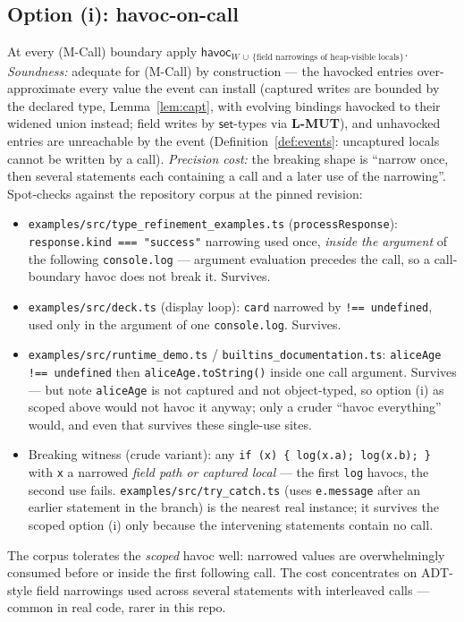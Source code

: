 \documentclass[11pt]{article}
\newcommand{\havoc}{\mathsf{havoc}}
\begin{document}
\subsection{Option (i): havoc-on-call}
At every (M-Call) boundary apply
$\havoc_{W \,\cup\, \{\text{field narrowings of heap-visible locals}\}}$.
\emph{Soundness:} adequate for (M-Call) by construction — the havocked
entries over-approximate every value the event can install (captured
writes are bounded by the declared type, Lemma~\ref{lem:capt}, with
evolving bindings havocked to their widened union instead; field writes
by $\mathsf{set}$-types via \textbf{L-MUT}), and unhavocked entries are
unreachable by the event (Definition~\ref{def:events}: uncaptured locals
cannot be written by a call). \emph{Precision cost:} the breaking shape
is ``narrow once, then several statements each containing a call and a
later use of the narrowing''. Spot-checks against the repository corpus
at the pinned revision:
\begin{itemize}
\item \texttt{examples/src/type\_refinement\_examples.ts}
  (\texttt{processResponse}): \texttt{response.kind === "success"}
  narrowing used once, \emph{inside the argument} of the following
  \texttt{console.log} — argument evaluation precedes the call, so a
  call-boundary havoc does not break it. Survives.
\item \texttt{examples/src/deck.ts} (display loop): \texttt{card}
  narrowed by \texttt{!== undefined}, used only in the argument of one
  \texttt{console.log}. Survives.
\item \texttt{examples/src/runtime\_demo.ts} /
  \texttt{builtins\_documentation.ts}: \texttt{aliceAge !== undefined}
  then \texttt{aliceAge.toString()} inside one call argument. Survives —
  but note \texttt{aliceAge} is not captured and not object-typed, so
  option (i) as scoped above would not havoc it anyway; only a cruder
  ``havoc everything'' would, and even that survives these single-use
  sites.
\item Breaking witness (crude variant): any
  \texttt{if (x) \{ log(x.a); log(x.b); \}} with \texttt{x} a narrowed
  \emph{field path or captured local} — the first \texttt{log} havocs,
  the second use fails. \texttt{examples/src/try\_catch.ts} (uses
  \texttt{e.message} after an earlier statement in the branch) is the
  nearest real instance; it survives the scoped option (i) only because
  the intervening statements contain no call.
\end{itemize}
The corpus tolerates the \emph{scoped} havoc well: narrowed values are
overwhelmingly consumed before or inside the first following call. The
cost concentrates on ADT-style field narrowings used across several
statements with interleaved calls — common in real code, rarer in this
repo.
\end{document}
